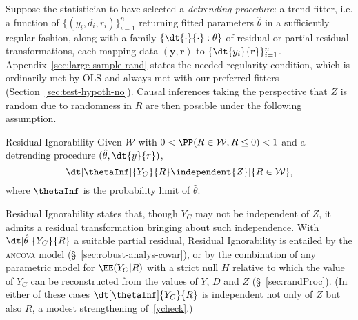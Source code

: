 Suppose the statistician to have selected a \textit{detrending procedure}: a
trend fitter, i.e. a function of
$\{({y}_{i},d_{i},r_{i})\}_{i=1}^{n}$ returning
fitted parameters $\hat{\theta}$ in a sufficiently regular
fashion, along with a
family $\{\dt{\cdot}{\cdot}: \theta\}$ of residual or partial
residual transformations, each mapping data $(\mathbf{y}, \mathbf{r})$ to
$\{\dt {y_{i}}{\mathbf{r}} \}_{i=1}^{n}$.
Appendix~\ref{sec:large-sample-rand}
states the
needed regularity condition, which is ordinarily met by OLS and always
met with our preferred fitters (Section~\ref{sec:test-hypoth-no}).
Causal inferences taking
the perspective that $Z$ is random due to
randomness in $R$ are then possible under the following assumption.

\begin{ass}{Residual Ignorability}
\sloppy
Given $\mathcal{W}$ with $0< \PP( R \in
\mathcal{W}, R\leq 0) < 1$ and a detrending procedure $(\hat{\theta}, \dt{y}{r})$,
\begin{equation}\label{ycheck}
\dt[\thetaInf]{Y_{C}}{ R }%
\independent {Z}| \{R \in \mathcal{W}\},
\end{equation}
where $\thetaInf$ is the probability limit of $\hat\theta$.
\end{ass}
Residual Ignorability states that, though $Y_C$ may not be independent of
$Z$,  it admits a residual transformation bringing about such
independence.   With $\dt[\hat\theta]{Y_{C}}{ R}$ a suitable
partial residual, Residual Ignorability is entailed by the
\textsc{ancova} model (\S~\ref{sec:robust-analys-covar}), or by the combination of any parametric model
for $\EE (Y_{C}| R)$ with a strict null $H$ relative to which the
value of $Y_{C}$ can be reconstructed from the values of $Y$, $D$ and
$Z$ (\S~\ref{sec:randProc}).
(In either of these cases $\dt[\thetaInf]{Y_{C}}{ R}$
is independent not only of $Z$ but also $R$,
a modest strengthening of~\eqref{ycheck}.)
